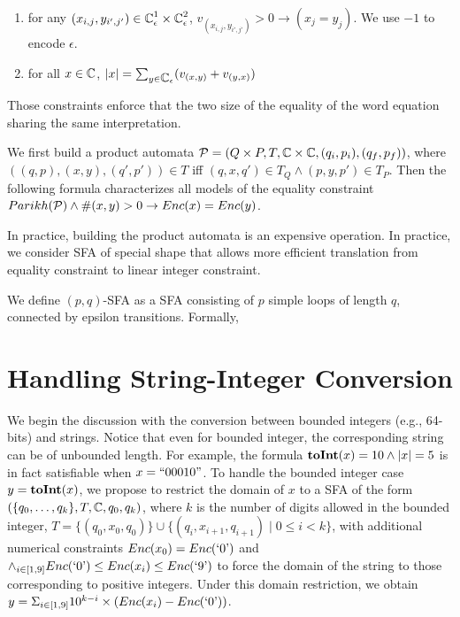 \documentclass{llncs}
\begin{document}
\begin{enumerate}
	\item for any $(x_{i,j},y_{i',j'}) \in \mbox{$\mathbb{C}$}^1_\epsilon \times \mbox{$\mathbb{C}$}^2_\epsilon$, $v_{(x_{i,j},y_{i',j'})}>0 \rightarrow (x_j=y_{j})$. We use $-1$ to encode $\epsilon$.
	\item for all $x \in \mbox{$\mathbb{C}$}$, $|x| =\sum_{y \in \mbox{$\mathbb{C}$}_\epsilon} (v_{(x,y)}+v_{(y,x)})$
\end{enumerate}
Those constraints enforce that the two size of the equality of the word equation sharing the same interpretation.






We first build a product automata $\mathcal{P}=(Q\times P, T, \mbox{$\mathbb{C}$}\times \mbox{$\mathbb{C}$}, (q_i,p_i), (q_f,p_f))$, where $((q,p),(x,y), (q',p'))\in T$ iff $(q,x,q')\in T_Q \wedge (p,y,p')\in T_P$. Then the following formula characterizes all models of the equality constraint $Parikh(\mathcal{P}) \wedge \#(x,y) > 0 \rightarrow Enc(x) = Enc(y)$.

In practice, building the product automata is an expensive operation. In practice, we consider SFA of special shape that allows more efficient translation from equality constraint to linear integer constraint.

We define $(p,q)$-SFA as a SFA consisting of $p$ simple loops of length $q$, connected by epsilon transitions. Formally, 






\section{Handling String-Integer Conversion} \label{section:s2i}
We begin the discussion with the conversion between bounded integers (e.g., 64-bits) and strings. Notice that even for bounded integer, the corresponding string can be of unbounded length. For example, the formula $\mbox{\textbf{toInt}($x$)}=10 \wedge |x|=5$ is in fact satisfiable when $x=``00010"$. To handle the bounded integer case $y=\mbox{\textbf{toInt}($x$)}$, we propose to restrict the domain of $x$ to a SFA of the form $(\{q_0,\ldots,q_k\},T,\mbox{$\mathbb{C}$}, q_0,q_k)$, where $k$ is the number of digits allowed in the bounded integer, $T = \{(q_0,x_0,q_0)\} \cup \{(q_i,x_{i+1},q_{i+1})\mid 0\leq i <k\}$, with additional numerical constraints $Enc(x_0)=Enc(\mbox{`0'})$ and $\wedge_{i\in [1,9]} Enc(\mbox{`0'})\leq Enc(x_i) \leq Enc(\mbox{`9'})$ to force the domain of the string to those corresponding to positive integers. Under this domain restriction, we obtain $y=\Sigma_{i\in [1,9]} 10^{k-i}\times (Enc(x_i)-Enc(\mbox{`0'}))$.
\end{document}
